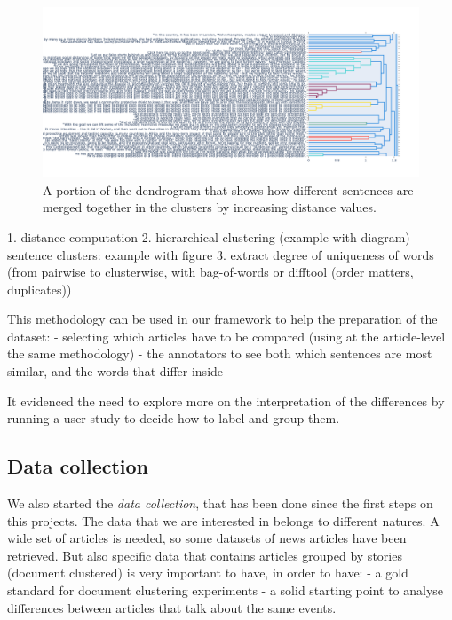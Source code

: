 \begin{figure}[!htb]
    \centering
    \includegraphics[width=\linewidth]{figures/dendrogram.png}
    \caption{A portion of the dendrogram that shows how different sentences are merged together in the clusters by increasing distance values.}
    \label{fig:my_label}
\end{figure}

1. distance computation
2. hierarchical clustering (example with diagram)
sentence clusters: example with figure
3. extract degree of uniqueness of words (from pairwise to clusterwise, with bag-of-words or difftool (order matters, duplicates))


This methodology can be used in our framework to help the preparation of the dataset:
- selecting which articles have to be compared (using at the article-level the same methodology)
- the annotators to see both which sentences are most similar, and the words that differ inside

It evidenced the need to explore more on the interpretation of the differences by running a user study to decide how to label and group them.


\subsection{Data collection}
We also started the \emph{data collection}, that has been done since the first steps on this projects.
The data that we are interested in belongs to different natures.
A wide set of articles is needed, so some datasets of news articles have been retrieved.
But also specific data that contains articles grouped by stories (document clustered) is very important to have, in order to have:
- a gold standard for document clustering experiments
- a solid starting point to analyse differences between articles that talk about the same events.

